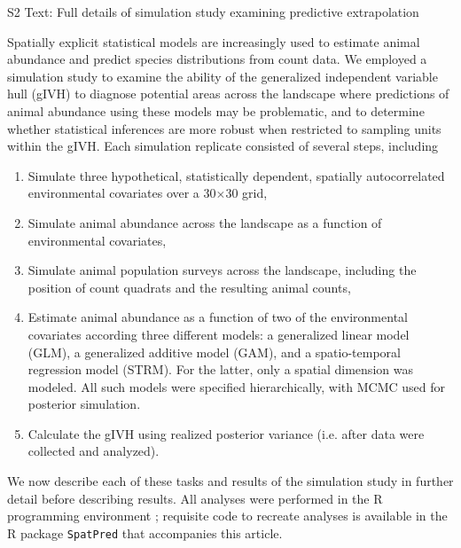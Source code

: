 \documentclass[12pt,fleqn]{article}
\begin{document}
\rm \begin{flushleft}

\raggedbottom
\vspace{.5in}

\begin{center}
S2 Text: Full details of simulation study examining predictive extrapolation
\bigskip
\end{center}
\vspace{.3in}

\doublespacing

Spatially explicit statistical models are increasingly used to estimate animal abundance and predict species distributions from count data.  We employed a simulation study to examine the ability of the generalized independent variable hull (gIVH) to diagnose potential areas across the landscape where predictions of animal abundance using these models may be problematic, and to determine whether statistical inferences are more robust when restricted to sampling units within the gIVH.  Each simulation replicate consisted of several steps, including
\begin{enumerate}
  \item Simulate three hypothetical, statistically dependent, spatially autocorrelated environmental covariates over a 30$\times$30 grid,
  \item Simulate animal abundance across the landscape as a function of environmental covariates,
  \item Simulate animal population surveys across the landscape, including the position of count quadrats and the resulting animal counts,
  \item Estimate animal abundance as a function of two of the environmental covariates according three different models: a generalized linear model (GLM), a generalized additive model (GAM), and a spatio-temporal regression model (STRM).  For the latter, only a spatial dimension was modeled.  All such models were specified hierarchically, with MCMC used for posterior simulation.
  \item Calculate the gIVH using realized posterior variance (i.e. after data were collected and analyzed).
\end{enumerate}
We now describe each of these tasks and results of the simulation study in further detail before describing results.  All analyses were performed in the R programming environment \citep{RTeam2012}; requisite code to recreate analyses is available in the R package \texttt{SpatPred} that accompanies this article.


\end{flushleft}
\end{document}
